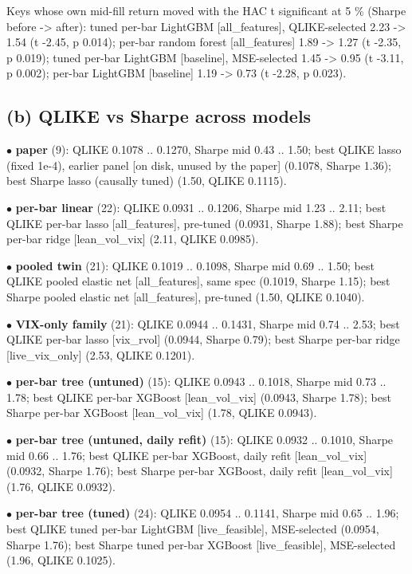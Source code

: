 \documentclass[10pt]{article}
\begin{document}
\endgroup
Keys whose own mid-fill return moved with the HAC t significant at 5 \% (Sharpe before -> after): tuned per-bar LightGBM [all\_features], QLIKE-selected 2.23 -> 1.54 (t -2.45, p 0.014); per-bar random forest [all\_features] 1.89 -> 1.27 (t -2.35, p 0.019); tuned per-bar LightGBM [baseline], MSE-selected 1.45 -> 0.95 (t -3.11, p 0.002); per-bar LightGBM [baseline] 1.19 -> 0.73 (t -2.28, p 0.023).\par
\subsection*{(b) QLIKE vs Sharpe across models}
$\bullet$ \textbf{paper} (9): QLIKE 0.1078 .. 0.1270, Sharpe mid 0.43 .. 1.50; best QLIKE lasso (fixed 1e-4), earlier panel [on disk, unused by the paper] (0.1078, Sharpe 1.36); best Sharpe lasso (causally tuned) (1.50, QLIKE 0.1115).\par
$\bullet$ \textbf{per-bar linear} (22): QLIKE 0.0931 .. 0.1206, Sharpe mid 1.23 .. 2.11; best QLIKE per-bar lasso [all\_features], pre-tuned (0.0931, Sharpe 1.88); best Sharpe per-bar ridge [lean\_vol\_vix] (2.11, QLIKE 0.0985).\par
$\bullet$ \textbf{pooled twin} (21): QLIKE 0.1019 .. 0.1098, Sharpe mid 0.69 .. 1.50; best QLIKE pooled elastic net [all\_features], same spec (0.1019, Sharpe 1.15); best Sharpe pooled elastic net [all\_features], pre-tuned (1.50, QLIKE 0.1040).\par
$\bullet$ \textbf{VIX-only family} (21): QLIKE 0.0944 .. 0.1431, Sharpe mid 0.74 .. 2.53; best QLIKE per-bar lasso [vix\_rvol] (0.0944, Sharpe 0.79); best Sharpe per-bar ridge [live\_vix\_only] (2.53, QLIKE 0.1201).\par
$\bullet$ \textbf{per-bar tree (untuned)} (15): QLIKE 0.0943 .. 0.1018, Sharpe mid 0.73 .. 1.78; best QLIKE per-bar XGBoost [lean\_vol\_vix] (0.0943, Sharpe 1.78); best Sharpe per-bar XGBoost [lean\_vol\_vix] (1.78, QLIKE 0.0943).\par
$\bullet$ \textbf{per-bar tree (untuned, daily refit)} (15): QLIKE 0.0932 .. 0.1010, Sharpe mid 0.66 .. 1.76; best QLIKE per-bar XGBoost, daily refit [lean\_vol\_vix] (0.0932, Sharpe 1.76); best Sharpe per-bar XGBoost, daily refit [lean\_vol\_vix] (1.76, QLIKE 0.0932).\par
$\bullet$ \textbf{per-bar tree (tuned)} (24): QLIKE 0.0954 .. 0.1141, Sharpe mid 0.65 .. 1.96; best QLIKE tuned per-bar LightGBM [live\_feasible], MSE-selected (0.0954, Sharpe 1.76); best Sharpe tuned per-bar XGBoost [live\_feasible], MSE-selected (1.96, QLIKE 0.1025).\par
\end{document}

